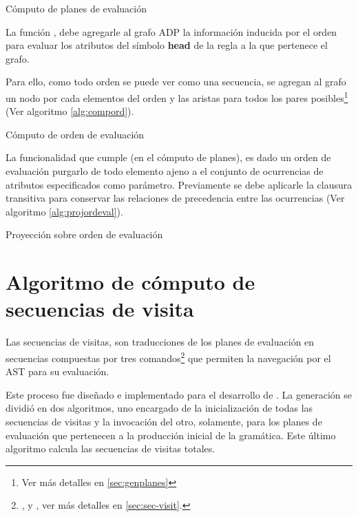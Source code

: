 \begin{algorithm}[!ht]

\caption{\label{alg:planeval} Cómputo de planes de evaluación}
\end{algorithm}

La función , debe agregarle al grafo ADP la información inducida por el orden para evaluar los atributos del símbolo \textbf{head} de la regla a la que pertenece el grafo.

Para ello, como todo orden se puede ver como una secuencia, se agregan al grafo un nodo por cada elementos del orden y las aristas para todos los pares posibles\footnote{Ver más detalles en \ref{sec:genplanes}} (Ver algoritmo \ref{alg:compord}).

\begin{algorithm}[!ht]

\caption{\label{alg:compord}Cómputo de orden de evaluación}
\end{algorithm}

La funcionalidad que cumple  (en el cómputo de planes), es dado un orden de evaluación purgarlo de todo elemento ajeno a el conjunto de ocurrencias de atributos especificados como parámetro. Previamente se debe aplicarle la clausura transitiva para conservar las relaciones de precedencia entre las ocurrencias (Ver algoritmo \ref{alg:projordeval}).

\begin{algorithm}[!ht]

\caption{\label{alg:projordeval} Proyección sobre orden de evaluación}
\end{algorithm}

\section{Algoritmo de cómputo de secuencias de visita}
\label{sec:algseqvisit}

Las secuencias de visitas, son traducciones de los planes de evaluación en secuencias compuestas por tres comandos\footnote{,  y , ver más detalles en \ref{sec:sec-visit}.} que permiten la navegación por el AST para su evaluación.

Este proceso fue diseñado e implementado para el desarrollo de \maggen. La generación se dividió en dos algoritmos, uno encargado de la inicialización de todas las secuencias de visitas y la invocación del otro, solamente, para los planes de evaluación que pertenecen a la producción inicial de la gramática. Este último algoritmo calcula las secuencias de visitas totales.

